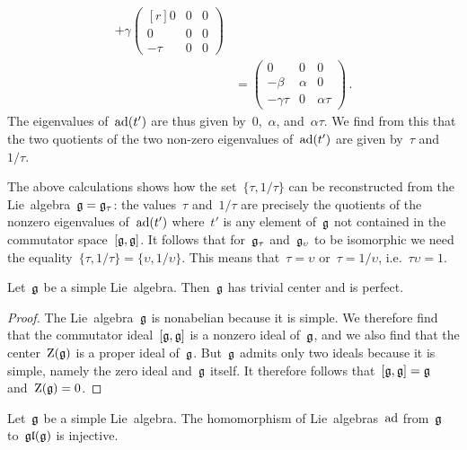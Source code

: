 \begin{example}
\begin{align*}
		+
		\gamma
		\begin{pmatrix*}[r]
			0     & 0 & 0 \\
			0     & 0 & 0 \\
			-\tau & 0 & 0
		\end{pmatrix*}
		\\
		&=
		\begin{pmatrix}
			 0          & 0       & 0           \\
			-\beta      & \alpha  & 0           \\
			-\gamma\tau & 0       & \alpha \tau
		\end{pmatrix} \,.
	\end{align*}
	The eigenvalues of~$\operatorname{ad}(t')$ are thus given by~$0$,~$\alpha$, and~$\alpha \tau$.
	We find from this that the two quotients of the two non-zero eigenvalues of~$\operatorname{ad}(t')$ are given by~$\tau$ and~$1 / \tau$.

	The above calculations shows how the set~$\{ \tau, 1 / \tau \}$ can be reconstructed from the Lie~algebra~$\mathfrak{g} = \mathfrak{g}_\tau$:
	the values~$\tau$ and~$1/\tau$ are precisely the quotients of the nonzero eigenvalues of~$\operatorname{ad}(t')$ where~$t'$ is any element of~$\mathfrak{g}$ not contained in the commutator space~$[\mathfrak{g}, \mathfrak{g}]$.
	It follows that for~$\mathfrak{g}_\tau$ and~$\mathfrak{g}_\upsilon$ to be isomorphic we need the equality~$\{ \tau , 1/\tau \} = \{ \upsilon, 1/\upsilon \}$.
	This means that~$\tau = \upsilon$ or~$\tau = 1 / \upsilon$, i.e.~$\tau \upsilon = 1$.
\end{example}


\begin{proposition}
	\label{commutator and center of simple}
	Let~$\mathfrak{g}$ be a simple Lie~algebra.
	Then~$\mathfrak{g}$ has trivial center and is perfect.
\end{proposition}


\begin{proof}
	The Lie~algebra~$\mathfrak{g}$ is nonabelian because it is simple.
	We therefore find that the commutator ideal~$[\mathfrak{g}, \mathfrak{g}]$ is a nonzero ideal of~$\mathfrak{g}$, and we also find that the center~$\operatorname{Z}(\mathfrak{g})$ is a proper ideal of~$\mathfrak{g}$.
	But~$\mathfrak{g}$ admits only two ideals because it is simple, namely the zero ideal and~$\mathfrak{g}$ itself.
	It therefore follows that~$[\mathfrak{g}, \mathfrak{g}] = \mathfrak{g}$ and~$\operatorname{Z}(\mathfrak{g}) = 0$.
\end{proof}


\begin{corollary}
	\label{ad is injective for simple}
	Let~$\mathfrak{g}$ be a simple Lie~algebra.
	The homomorphism of Lie~algebras~$\operatorname{ad}$ from~$\mathfrak{g}$ to~$\mathfrak{gl}(\mathfrak{g})$ is injective.
\end{corollary}


